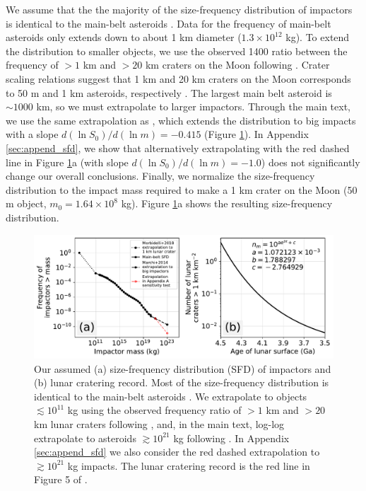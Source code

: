 \documentclass{aastex631}
\begin{document}
We assume that the the majority of the size-frequency distribution of impactors is identical to the main-belt asteroids \citep[Extended Data Figure 1 in][]{Marchi_2014}. Data for the frequency of main-belt asteroids only extends down to about 1 km diameter ($1.3 \times 10^{12} $ kg). To extend the distribution to smaller objects, we use the observed 1400 ratio between the frequency of $> 1$ km and $> 20$ km craters on the Moon following \citet{Morbidelli_2018}. Crater scaling relations suggest that 1 km and 20 km craters on the Moon corresponds to 50 m and 1 km asteroids, respectively \citep{Morbidelli_2018}. The largest main belt asteroid is $\sim 1000$ km, so we must extrapolate to larger impactors. Through the main text, we use the same extrapolation as \citet{Marchi_2014}, which extends the distribution to big impacts with a slope $d (\ln S_0)/d (\ln m) = - 0.415$ (Figure \ref{fig:sfd_and_flux}). In Appendix \ref{sec:append_sfd}, we show that alternatively extrapolating with the red dashed line in Figure \ref{fig:sfd_and_flux}a (with slope $d (\ln S_0)/d (\ln m) = - 1.0$) does not significantly change our overall conclusions. Finally, we normalize the size-frequency distribution to the impact mass required to make a 1 km crater on the Moon (50 m object, $m_0 = 1.64 \times 10^{8}$ kg). Figure \ref{fig:sfd_and_flux}a shows the resulting size-frequency distribution.

\begin{figure}
  \centering
  \includegraphics[width=1.0\textwidth]{figures/SFD_and_flux.pdf}
  \caption{Our assumed (a) size-frequency distribution (SFD) of impactors and (b) lunar cratering record. Most of the size-frequency distribution is identical to the main-belt asteroids \citep[Extended Data Figure 1 in][]{Marchi_2014}. We extrapolate to objects $\lesssim 10^{11}$ kg using the observed frequency ratio of $> 1$ km and $> 20$ km lunar craters following \citet{Morbidelli_2018}, and, in the main text, log-log extrapolate to asteroids $\gtrsim 10^{21}$ kg following \citet{Marchi_2014}. In Appendix \ref{sec:append_sfd} we also consider the red dashed extrapolation to $\gtrsim 10^{21}$ kg impacts. The lunar cratering record is the red line in Figure 5 of \citet{Morbidelli_2018}.}
  \label{fig:sfd_and_flux}
\end{figure}
\end{document}
